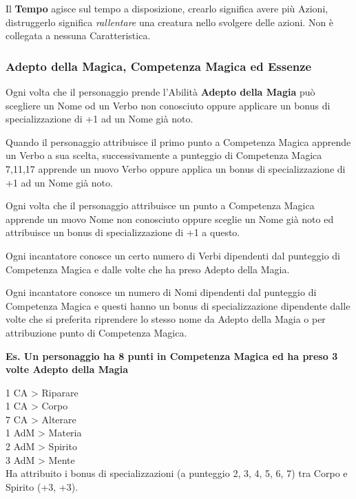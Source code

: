 \documentclass[a4paper,twoside,openany]{book}
\begin{document}
\begin{multicols}{2}
Il \textbf{Tempo} agisce sul tempo a disposizione, crearlo significa avere più Azioni, distruggerlo significa \emph{rallentare} una creatura nello svolgere delle azioni. Non è collegata a nessuna Caratteristica.


\subsubsection{Adepto della Magica, Competenza Magica ed Essenze}

\label{competenza-magica-ed-essenza}

Ogni volta che il personaggio prende l'Abilità \textbf{Adepto della Magia} può scegliere un Nome od un Verbo non conosciuto oppure applicare un bonus di specializzazione di +1 ad un Nome già noto.

Quando il personaggio attribuisce il primo punto a Competenza Magica apprende un Verbo a sua scelta, successivamente a punteggio di Competenza Magica 7,11,17 apprende un nuovo Verbo oppure applica un bonus di specializzazione di +1 ad un Nome già noto.

Ogni volta che il personaggio attribuisce un punto a Competenza Magica apprende un nuovo Nome non conosciuto oppure sceglie un Nome già noto ed attribuisce un bonus di specializzazione di +1 a questo.

Ogni incantatore conosce un certo numero di Verbi dipendenti dal punteggio di Competenza Magica e dalle volte che ha preso Adepto della Magia.

Ogni incantatore conosce un numero di Nomi dipendenti dal punteggio di Competenza Magica e questi hanno un bonus di specializzazione dipendente dalle volte che si preferita riprendere lo stesso nome da Adepto della Magia o per attribuzione punto di Competenza Magica.


\bigskip

\textbf{Es. Un personaggio ha 8 punti in Competenza Magica ed ha preso 3 volte Adepto della Magia}

\medskip

1 CA > Riparare\\
1 CA > Corpo\\
7 CA > Alterare\\
1 AdM > Materia\\
2 AdM > Spirito\\
3 AdM > Mente\\

Ha attribuito i bonus di specializzazioni (a punteggio 2, 3, 4, 5, 6, 7) tra Corpo e Spirito (+3, +3).


\end{multicols}
\end{document}
